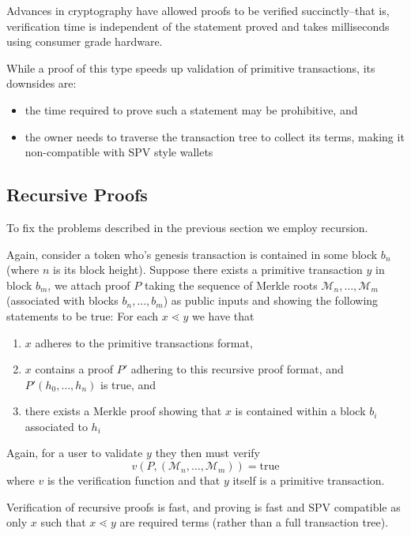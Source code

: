 \documentclass[9pt,oneside]{amsart}
\begin{document}
\begin{multicols}{2}
Advances in cryptography have allowed proofs to be verified succinctly--that is, verification time is independent of the statement proved and takes milliseconds using consumer grade hardware.


While a proof of this type speeds up validation of primitive transactions, its downsides are:
\begin{itemize}
    \item the time required to prove such a statement may be prohibitive, and
    \item the owner needs to traverse the transaction tree to collect its terms, making it non-compatible with SPV style wallets
\end{itemize}

\subsection{Recursive Proofs}
To fix the problems described in the previous section we employ recursion. 

Again, consider a token who's genesis transaction is contained in some block $b_{n}$ (where $n$ is its block height). Suppose there exists a primitive transaction $y$ in block $b_{m}$, we attach proof $P$ taking the sequence of Merkle roots $\mathcal{M}_{n}, \dots, \mathcal{M}_{m}$ (associated with blocks $b_{n}, \dots, b_{m}$) as public inputs and showing the following statements to be true:
For each $x \lessdot y$ we have that
\begin{enumerate}
    \item $x$ adheres to the primitive transactions format,
    \item $x$ contains a proof $P'$ adhering to this recursive proof format, and $P'(h_{0}, \dots, h_{n})$ is true, and
    \item there exists a Merkle proof showing that $x$ is contained within a block $b_{i}$ associated to $h_{i}$
\end{enumerate}

Again, for a user to validate $y$ they then must verify
\[v(P, (\mathcal{M}_{n}, \dots, \mathcal{M}_{m})) = \text{true}\] 
where $v$ is the verification function and that $y$ itself is a primitive transaction.

Verification of recursive proofs is fast, and proving is fast and SPV compatible as only $x$ such that $x \lessdot y$ are required terms (rather than a full transaction tree).


\end{multicols}
\end{document}
